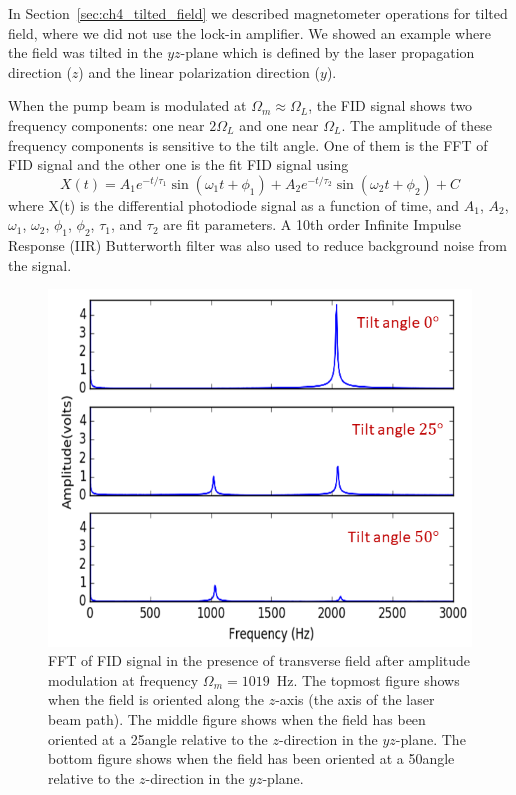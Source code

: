 
In Section~\ref{sec:ch4_tilted_field} we described magnetometer
operations for tilted field, where we did not use the lock-in
amplifier.  We showed an example where the field was tilted in the
$yz$-plane which is defined by the laser propagation direction ($z$)
and the linear polarization direction ($y$).

When the pump beam is modulated at $\Omega_m\approx \Omega_L$, the FID
signal shows two frequency components: one near $2\Omega_L$ and one
near $\Omega_L$.  The amplitude of these frequency components is
sensitive to the tilt angle. One of them is the FFT of FID signal and
the other one is the fit FID signal using
\begin{equation}
  X(t)=A_1e^{-t/\tau_1}\sin(\omega_1t+\phi_1)+A_2e^{-t/\tau_2}\sin(\omega_2t+\phi_2)+C
\label{eq:two_sinewave}
\end{equation}
where X(t) is the differential photodiode signal as a function of
time, and $A_1$, $A_2$, $\omega_1$, $\omega_2$, $\phi_1$, $\phi_2$,
$\tau_1$, and $\tau_2$ are fit parameters.  A 10th order Infinite
Impulse Response (IIR) Butterworth filter was also used to reduce
background noise from the signal.

\begin{figure}%
\centering\includegraphics[width=0.7\linewidth]{figures/fft_amp.png}
\caption{FFT of FID signal in the presence of transverse field after
  amplitude modulation at frequency $\Omega_m=1019$~Hz.  The topmost
  figure shows when the field is oriented along the $z$-axis (the axis
  of the laser beam path).  The middle figure shows when the field has
  been oriented at a 25\degree angle relative to the $z$-direction in
  the $yz$-plane.  The bottom figure shows when the field has been
  oriented at a 50\degree angle relative to the $z$-direction in the
  $yz$-plane.\label{fig:fft-amplitude}}
\end{figure}

